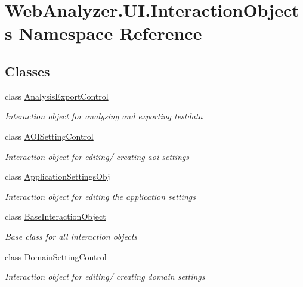 \hypertarget{namespace_web_analyzer_1_1_u_i_1_1_interaction_objects}{}\section{Web\+Analyzer.\+U\+I.\+Interaction\+Objects Namespace Reference}
\label{namespace_web_analyzer_1_1_u_i_1_1_interaction_objects}
\subsection*{Classes}
\begin{DoxyCompactItemize}
\item 
class \hyperlink{class_web_analyzer_1_1_u_i_1_1_interaction_objects_1_1_analysis_export_control}{Analysis\+Export\+Control}
\begin{DoxyCompactList}\small\item\em Interaction object for analysing and exporting testdata \end{DoxyCompactList}\item 
class \hyperlink{class_web_analyzer_1_1_u_i_1_1_interaction_objects_1_1_a_o_i_setting_control}{A\+O\+I\+Setting\+Control}
\begin{DoxyCompactList}\small\item\em Interaction object for editing/ creating aoi settings \end{DoxyCompactList}\item 
class \hyperlink{class_web_analyzer_1_1_u_i_1_1_interaction_objects_1_1_application_settings_obj}{Application\+Settings\+Obj}
\begin{DoxyCompactList}\small\item\em Interaction object for editing the application settings \end{DoxyCompactList}\item 
class \hyperlink{class_web_analyzer_1_1_u_i_1_1_interaction_objects_1_1_base_interaction_object}{Base\+Interaction\+Object}
\begin{DoxyCompactList}\small\item\em Base class for all interaction objects \end{DoxyCompactList}\item 
class \hyperlink{class_web_analyzer_1_1_u_i_1_1_interaction_objects_1_1_domain_setting_control}{Domain\+Setting\+Control}
\begin{DoxyCompactList}\small\item\em Interaction object for editing/ creating domain settings \end{DoxyCompactList}\item 

\end{DoxyCompactItemize}
